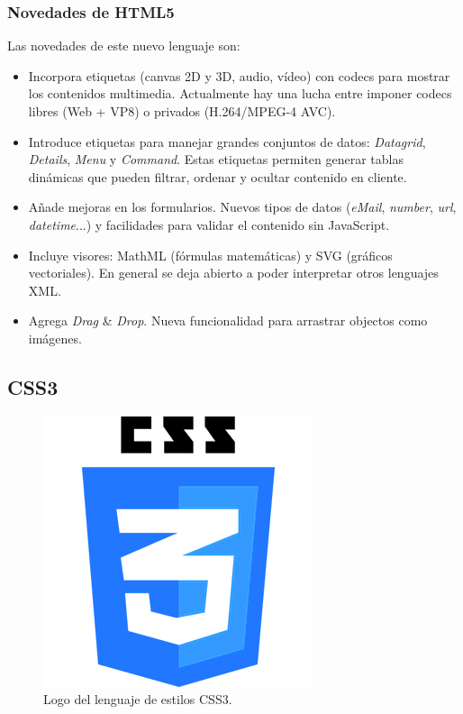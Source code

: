 \subsubsection{Novedades de HTML5}

Las novedades de este nuevo lenguaje son:

\begin{itemize}

\item Incorpora etiquetas (canvas 2D y 3D, audio, v\'ideo) con codecs para mostrar los contenidos multimedia. Actualmente hay una lucha entre imponer codecs libres (Web + VP8) o privados (H.264/MPEG-4 AVC).
\item Introduce etiquetas para manejar grandes conjuntos de datos: \textit{Datagrid}, \textit{Details}, \textit{Menu} y \textit{Command}. Estas etiquetas permiten generar tablas din\'amicas que pueden filtrar, ordenar y ocultar contenido en cliente.
\item A\~nade mejoras en los formularios. Nuevos tipos de datos (\textit{eMail}, \textit{number}, \textit{url}, \textit{datetime}...) y facilidades para validar el contenido sin JavaScript.
\item Incluye visores: MathML (f\'ormulas matem\'aticas) y SVG (gr\'aficos vectoriales). En general se deja abierto a poder interpretar otros lenguajes XML.
\item Agrega \textit{Drag} \& \textit{Drop}. Nueva funcionalidad para arrastrar objectos como im\'agenes.

\end{itemize}

\subsection{CSS3}

\begin{figure}[htbp]

    \centering
    	\includegraphics[scale=0.3]{./Figuras/css3logo.png}
    \caption{Logo del lenguaje de estilos CSS3. }
    \label{fig:css3}
    
\end{figure}

